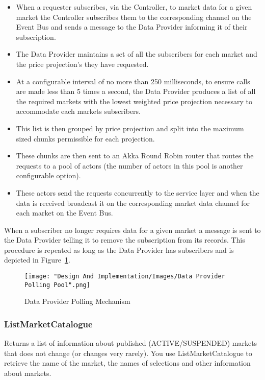 			\begin{itemize}
				\item When a requester subscribes, via the Controller, to market data for a given market the Controller subscribes them to the corresponding channel on the Event Bus and sends a message to the Data Provider informing it of their subscription.
				\item The Data Provider maintains a set of all the subscribers for each market and the price projection's they have requested. 
				\item At a configurable interval of no more than 250 milliseconds, to ensure calls are made less than 5 times a second, the Data Provider produces a list of all the required markets with the lowest weighted price projection necessary to accommodate each markets subscribers.
				\item This list is then grouped by price projection and split into the maximum sized chunks permissible for each projection.
				\item These chunks are then sent to an Akka Round Robin router\cite{AkkaRoundRobinRouter} that routes the requests to a pool of actors (the number of actors in this pool is another configurable option).
				\item These actors send the requests concurrently to the service layer and when the data is received broadcast it on the corresponding market data channel for each market on the Event Bus.
			\end{itemize}
			
			When a subscriber no longer requires data for a given market a message is sent to the Data Provider telling it to remove the subscription from its records. This procedure is repeated as long as the Data Provider has subscribers and is depicted in Figure~\ref{fig:dataProviderPolling}.  
			
			\begin{figure}[H]
				\texttt{[image: "Design And Implementation/Images/Data Provider Polling Pool".png]}
				\centering
				\caption{Data Provider Polling Mechanism}
    				\label{fig:dataProviderPolling}
			\end{figure}			
			
		\subsubsection{ListMarketCatalogue}
			Returns a list of information about published (ACTIVE/SUSPENDED) markets that does not change (or changes very rarely). You use ListMarketCatalogue to retrieve the name of the market, the names of selections and other information about markets\cite{ListMarketCatalogue}.\\
			
